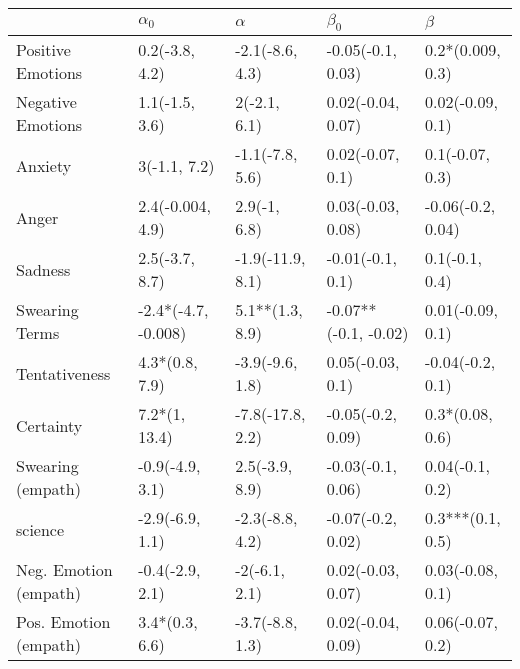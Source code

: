 \begin{tabular}{lllll}
\toprule
{} &           $\alpha_0$ &          $\alpha$ &             $\beta_0$ &            $\beta$ \\
\midrule
Positive Emotions     &       0.2(-3.8, 4.2) &   -2.1(-8.6, 4.3) &     -0.05(-0.1, 0.03) &   0.2*(0.009, 0.3) \\
Negative Emotions     &       1.1(-1.5, 3.6) &      2(-2.1, 6.1) &     0.02(-0.04, 0.07) &   0.02(-0.09, 0.1) \\
Anxiety               &         3(-1.1, 7.2) &   -1.1(-7.8, 5.6) &      0.02(-0.07, 0.1) &    0.1(-0.07, 0.3) \\
Anger                 &     2.4(-0.004, 4.9) &      2.9(-1, 6.8) &     0.03(-0.03, 0.08) &  -0.06(-0.2, 0.04) \\
Sadness               &       2.5(-3.7, 8.7) &  -1.9(-11.9, 8.1) &      -0.01(-0.1, 0.1) &     0.1(-0.1, 0.4) \\
Swearing Terms        &  -2.4*(-4.7, -0.008) &   5.1**(1.3, 8.9) &  -0.07**(-0.1, -0.02) &   0.01(-0.09, 0.1) \\
Tentativeness         &       4.3*(0.8, 7.9) &   -3.9(-9.6, 1.8) &      0.05(-0.03, 0.1) &   -0.04(-0.2, 0.1) \\
Certainty             &        7.2*(1, 13.4) &  -7.8(-17.8, 2.2) &     -0.05(-0.2, 0.09) &    0.3*(0.08, 0.6) \\
Swearing (empath)     &      -0.9(-4.9, 3.1) &    2.5(-3.9, 8.9) &     -0.03(-0.1, 0.06) &    0.04(-0.1, 0.2) \\
science               &      -2.9(-6.9, 1.1) &   -2.3(-8.8, 4.2) &     -0.07(-0.2, 0.02) &   0.3***(0.1, 0.5) \\
Neg. Emotion (empath) &      -0.4(-2.9, 2.1) &     -2(-6.1, 2.1) &     0.02(-0.03, 0.07) &   0.03(-0.08, 0.1) \\
Pos. Emotion (empath) &       3.4*(0.3, 6.6) &   -3.7(-8.8, 1.3) &     0.02(-0.04, 0.09) &   0.06(-0.07, 0.2) \\
\bottomrule
\end{tabular}
